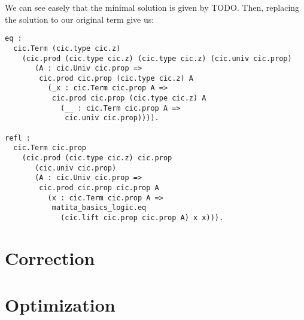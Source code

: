 \documentclass{article}
\begin{document}
We can see easely that the minimal solution is given by TODO. Then, replacing the solution to our original term give us:

\begin{verbatim}
eq :
  cic.Term (cic.type cic.z)
    (cic.prod (cic.type cic.z) (cic.type cic.z) (cic.univ cic.prop)
       (A : cic.Univ cic.prop =>
        cic.prod cic.prop (cic.type cic.z) A
          (_x : cic.Term cic.prop A =>
           cic.prod cic.prop (cic.type cic.z) A
             (__ : cic.Term cic.prop A =>
              cic.univ cic.prop)))).

refl :
  cic.Term cic.prop
    (cic.prod (cic.type cic.z) cic.prop
       (cic.univ cic.prop)
       (A : cic.Univ cic.prop =>
        cic.prod cic.prop cic.prop A
          (x : cic.Term cic.prop A =>
           matita_basics_logic.eq
             (cic.lift cic.prop cic.prop A) x x))).
\end{verbatim}

\section{Correction}

\section{Optimization}
\end{document}
